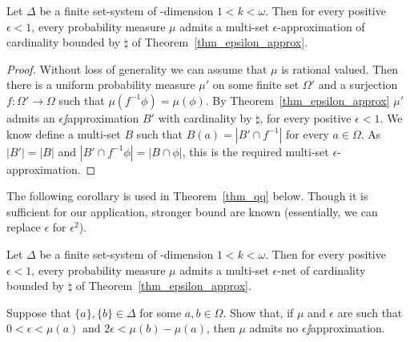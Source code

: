 \documentclass[creche.tex]{subfiles}
\begin{document}

% 

\begin{corollary}\label{coroll_epsilon_multiapprox}Let $\Delta$ be a finite set-system of \vc-dimension $1<k<\omega$. Then for every positive $\epsilon<1$, every probability measure $\mu$ admits a multi-set $\epsilon$-approximation of cardinality bounded by $\natural$ of Theorem~\ref{thm_epsilon_approx}.
\end{corollary}
\begin{proof}
Without loss of generality we can assume that $\mu$ is rational valued. Then there is a uniform probability measure $\mu'$ on some finite set $\Omega'$ and a surjection $f:\Omega'\to\Omega$ such that $\mu(f^{-1}\phi)=\mu(\phi)$. By Theorem~\ref{thm_epsilon_approx} $\mu'$ admits an $\epsilon\jj$approximation $B'$ with cardinality by $\natural$, for every positive $\epsilon<1$. We know define a multi-set $B$ such that $B(a)=|B'\cap f^{-1}|$ for every $a\in\Omega$. As $|B'|=|B|$ and $|B'\cap f^{-1}\phi|=|B\cap\phi|$, this is the required multi-set $\epsilon$-approximation.
\end{proof}

The following corollary is used in Theorem~\ref{thm_qq} below. Though it is sufficient for our application, stronger bound are known (essentially, we can replace $\epsilon$ for $\epsilon^2$). 


\begin{corollary}\label{coroll_epsilon_net}
Let $\Delta$ be a finite set-system of \vc-dimension $1<k<\omega$. Then for every positive $\epsilon<1$, every probability measure $\mu$ admits a multi-set $\epsilon$-net of cardinality bounded by $\natural$ of Theorem~\ref{thm_epsilon_approx}.
\end{corollary}

\begin{exercise}\label{ex_counterexample}
Suppose that $\{a\},\{b\}\in\Delta$ for some $a,b\in\Omega$. Show that, if $\mu$ and $\epsilon$ are such that $0<\epsilon<\mu(a)$ and $2\epsilon<\mu(b)-\mu(a)$, then $\mu$ admits no $\epsilon\jj$approximation.\QED
\end{exercise}
\end{document}
